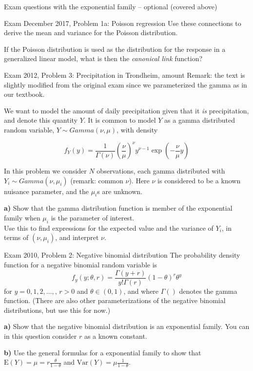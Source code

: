 \documentclass[
  ignorenonframetext,
]{beamer}
\begin{document}
\begin{frame}[fragile]
\begin{block}{Exam questions with the exponential family -- optional
(covered above)}
\begin{block}{Exam December 2017, Problem 1a: Poisson regression}
Use these connections to derive the mean and variance for the Poisson
distribution.

If the Poisson distribution is used as the distribution for the response
in a generalized linear model, what is then the \emph{canonical link}
function?
\end{block}

\begin{block}{Exam 2012, Problem 3: Precipitation in Trondheim, amount}
\protect\hypertarget{exam-2012-problem-3-precipitation-in-trondheim-amount}{}
Remark: the text is slightly modified from the original exam since we
parameterized the gamma as in our textbook.

We want to model the amount of daily precipitation given that it
\emph{is} precipitation, and denote this quantity \(Y\). It is common to
model \(Y\) as a gamma distributed random variable,
\(Y \sim Gamma(\nu,\mu)\), with density

\[ f_Y(y) = \frac{1}{\Gamma(\nu)} \left(\frac{\nu}{\mu}\right)^{\nu} y^{\nu-1}\exp\left(-\frac{\nu}{\mu} y \right) \]

In this problem we consider \(N\) observations, each gamma distributed
with \(Y_i \sim Gamma(\nu, \mu_i)\) (remark: common \(\nu\)). Here
\(\nu\) is considered to be a known nuisance parameter, and the
\(\mu_i\)s are unknown.

\textbf{a)} Show that the gamma distribution function is member of the
exponential family when \(\mu_i\) is the parameter of interest.\\
Use this to find expressions for the expected value and the variance of
\(Y_i\), in terms of \((\nu,\mu_i)\), and interpret \(\nu\).
\end{block}

\begin{block}{Exam 2010, Problem 2: Negative binomial distribution}
\protect\hypertarget{exam-2010-problem-2-negative-binomial-distribution}{}
The probability density function for a negative binomial random variable
is
\[f_y(y; \theta, r) = \frac{\Gamma(y + r)}{y! \Gamma(r)} (1-\theta)^r \theta^y\]
for \(y = 0,1,2,\ldots,\), \(r>0\) and \(\theta \in (0,1)\), and where
\(\Gamma()\) denotes the gamma function. (There are also other
parameterizations of the negative binomial distributions, but use this
for now.)

\textbf{a)} Show that the negative binomial distribution is an
exponential family. You can in this question consider \(r\) as a known
constant.

\textbf{b)} Use the general formulas for a exponential family to show
that \(\text{E}(Y)=\mu=r\frac{\theta}{1-\theta}\) and
\(\text{Var}(Y)=\mu \frac{1}{1-\theta}\).
\end{block}
\end{block}


\end{frame}
\end{document}
